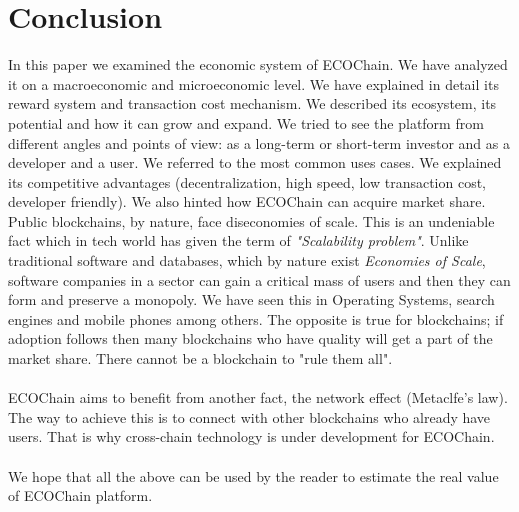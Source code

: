 \documentclass{article}
\begin{document}
\section{Conclusion}
In this paper we examined the economic system of ECOChain. We have analyzed it on a macroeconomic and microeconomic level. We have explained in detail its reward system and transaction cost mechanism. We described its ecosystem, its potential and how it can grow and expand. We tried to see the platform from different angles and points of view: as a long-term or short-term investor and as a developer and a user. We referred to the most common uses cases. We explained its competitive advantages (decentralization, high speed, low transaction cost, developer friendly). We also hinted how ECOChain can acquire market share. Public blockchains, by nature, face diseconomies of scale. This is an undeniable fact which in tech world has given the term of \emph{"Scalability problem"}. Unlike traditional software and databases, which by nature exist \emph{Economies of Scale}, software companies in a sector can gain a critical mass of users and then they can form and preserve a monopoly. We have seen this in Operating Systems, search engines and mobile phones among others. The opposite is true for blockchains; if adoption follows then many blockchains who have quality will get a part of the market share. There cannot be a blockchain to "rule them all".
\paragraph{}
ECOChain aims to benefit from another fact, the network effect (Metaclfe's law). The way to achieve this is to connect with other blockchains who already have users. That is why cross-chain technology is under development for ECOChain.
\paragraph{}
We hope that all the above can be used by the reader to estimate the real value of ECOChain platform.
\end{document}
